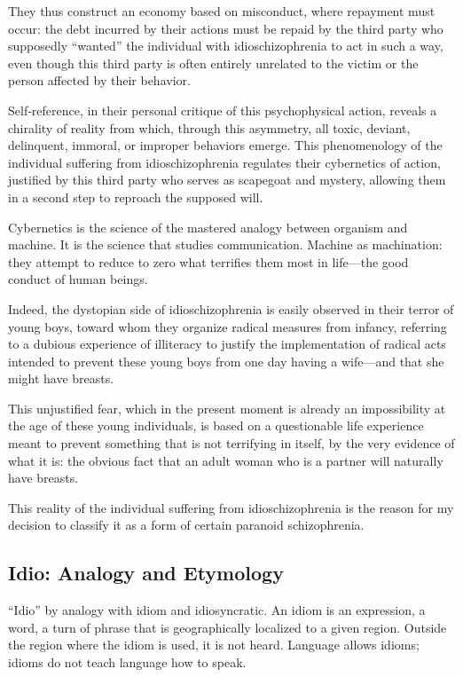 \documentclass[12pt,oneside]{article}
\begin{document}
They thus construct an economy based on misconduct, where repayment must occur: the debt incurred by their actions must be repaid by the third party who supposedly “wanted” the individual with idioschizophrenia to act in such a way, even though this third party is often entirely unrelated to the victim or the person affected by their behavior.

Self‑reference, in their personal critique of this psychophysical action, reveals a chirality of reality from which, through this asymmetry, all toxic, deviant, delinquent, immoral, or improper behaviors emerge. This phenomenology of the individual suffering from idioschizophrenia regulates their cybernetics of action, justified by this third party who serves as scapegoat and mystery, allowing them in a second step to reproach the supposed will.

Cybernetics is the science of the mastered analogy between organism and machine. It is the science that studies communication. Machine as machination: they attempt to reduce to zero what terrifies them most in life—the good conduct of human beings.

Indeed, the dystopian side of idioschizophrenia is easily observed in their terror of young boys, toward whom they organize radical measures from infancy, referring to a dubious experience of illiteracy to justify the implementation of radical acts intended to prevent these young boys from one day having a wife—and that she might have breasts.

This unjustified fear, which in the present moment is already an impossibility at the age of these young individuals, is based on a questionable life experience meant to prevent something that is not terrifying in itself, by the very evidence of what it is: the obvious fact that an adult woman who is a partner will naturally have breasts.

This reality of the individual suffering from idioschizophrenia is the reason for my decision to classify it as a form of certain paranoid schizophrenia.

\subsection*{Idio: Analogy and Etymology}

“Idio” by analogy with idiom and idiosyncratic. An idiom is an expression, a word, a turn of phrase that is geographically localized to a given region. Outside the region where the idiom is used, it is not heard. Language allows idioms; idioms do not teach language how to speak.
\end{document}
